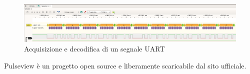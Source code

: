 \begin{figure}[H]
\centering
\includegraphics[scale=0.25]{images/pulseview.png}
\caption{Acquisizione e decodifica di un segnale UART}
\end{figure}

Pulseview è un progetto open source e liberamente scaricabile dal sito ufficiale\cite{Pulseview}.